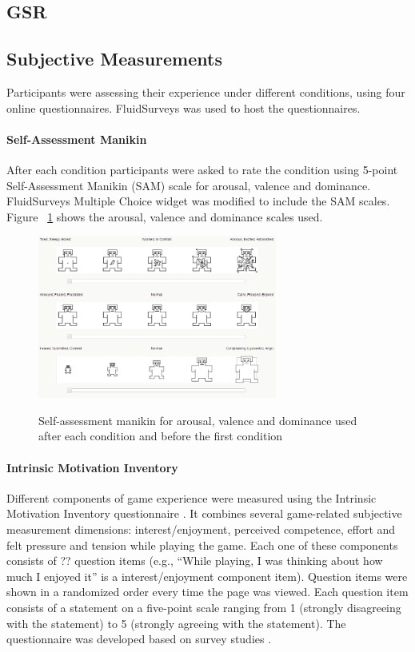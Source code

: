 \documentclass{uofsthesis-cs}
\begin{document}
\subsection{GSR}

\subsection{Subjective Measurements}

Participants were assessing their experience under different conditions, using four online questionnaires. FluidSurveys was used to host the questionnaires.

\paragraph{Self-Assessment Manikin}

After each condition participants were asked to rate the condition using 5-point Self-Assessment Manikin (SAM) \cite{bradley1994measuring} scale for arousal, valence and dominance. \textregistered FluidSurveys Multiple Choice widget was modified to include the SAM scales. Figure ~\ref{fig:sam} shows the arousal, valence and dominance scales used.

\begin{figure}[h!]
  \caption[Self-assessment manikin]
  {Self-assessment manikin for arousal, valence and dominance used after each condition and before the first condition}
  \centering
  \includegraphics[width=0.7\textwidth]{images/sam.png}
  \label{fig:sam}
\end{figure}

\paragraph{Intrinsic Motivation Inventory}

Different components of game experience were measured using the Intrinsic Motivation Inventory questionnaire \cite{?}. It combines several game-related subjective measurement dimensions: interest/enjoyment, perceived competence, effort and felt pressure and tension while playing the game. Each one of these components consists of ?? question items (e.g., ``While playing, I was thinking about how much I enjoyed it'' is a interest/enjoyment component item). Question items were shown in a randomized order every time the page was viewed. Each question item consists of a statement on a five-point scale ranging from 1 (strongly disagreeing with the statement) to 5 (strongly agreeing with the statement). The questionnaire was developed based on survey studies \cite{?}.
\end{document}
